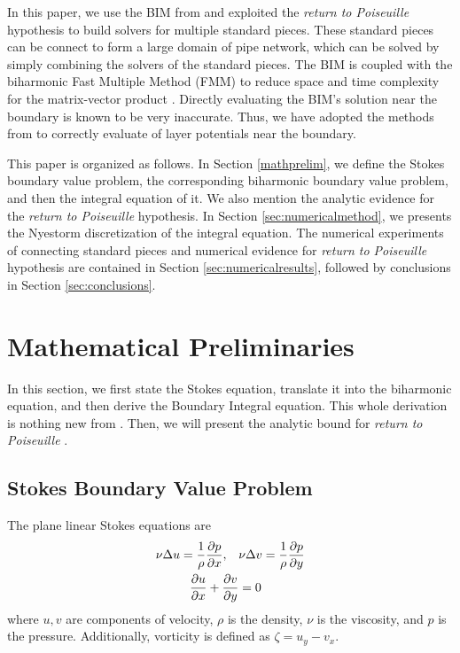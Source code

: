 \documentclass[10pt,twocolumn]{article}
\newtheorem[L]{thm}{Theorem}[section]
\begin{document}
In this paper, we use the BIM from \cite{greengardIntegralEquationMethods1996} 
and exploited the \textit{return to Poiseuille} hypothesis to build solvers for multiple standard pieces. 
These standard pieces can be connect to form a large domain of pipe network, 
which can be solved by simply combining the solvers of the standard pieces. 
The BIM is coupled with the biharmonic Fast Multiple Method (FMM) 
to reduce space and time complexity for the matrix-vector product \cite{FlatironinstituteFmm2d2022}.
Directly evaluating the BIM's solution near the boundary is known to be very inaccurate.
Thus, we have adopted the methods from 
\cite{wuSolutionStokesFlow2020,helsingEvaluationLayerPotentials2008} 
to correctly evaluate of layer potentials near the boundary. 


This paper is organized as follows. In Section \ref{mathprelim}, we define the Stokes boundary value problem, 
the corresponding biharmonic boundary value problem, and then the integral equation of it. 
We also mention the analytic evidence for the \textit{return to Poiseuille} hypothesis. In Section \ref{sec:numericalmethod}, we presents the Nyestorm discretization
of the integral equation. 
The numerical experiments of connecting standard pieces and numerical evidence for \textit{return to Poiseuille}
hypothesis are contained in Section \ref{sec:numericalresults}, 
followed by conclusions in Section \ref{sec:conclusions}.

\section{Mathematical Preliminaries\label{mathprelim}}

In this section, we first state the Stokes equation, translate it into the biharmonic equation, 
and then derive the Boundary Integral equation. This whole derivation is nothing new from \cite{greengardIntegralEquationMethods1996}. 
Then, we will present the analytic bound for \textit{return to Poiseuille} \cite{gregoryTractionBoundaryValue1980}. 

\subsection{Stokes Boundary Value Problem}

The plane linear Stokes equations are
\begin{align}
  \nu \Delta u = \frac 1 \rho \pdv{p}{x},\quad &\nu \Delta v = \frac 1\rho \pdv{p}{y} 
  \label{stokes} \\
  \pdv{u}{x} + \pdv{v}{y} &= 0
  \label{continuity}
\end{align}
where $u,v$ are components of velocity, 
$\rho$ is the density, 
$\nu$ is the viscosity, 
and $p$ is the pressure. 
Additionally, vorticity is defined as $\zeta  = u_y - v_x$. 
\end{document}
